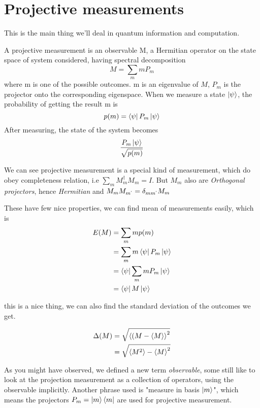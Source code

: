 \section{Projective measurements}
This is the main thing we'll deal in quantum information and computation.

\begin{postulate}
    A projective measurement is an observable M, a Hermitian operator on the state space of system considered, having spectral decomposition
    \begin{equation}
        M = \sum_m mP_m
    \end{equation}
    where m is one of the possible outcomes. m is an eigenvalue of $M$, $P_m$ is the projector onto the corresponding eigenspace. When we measure a state $\ket{\psi}$, the probability of getting the result m is
    \begin{equation}
        p(m) = \bra{\psi}P_m\ket{\psi}
    \end{equation}
    After measuring, the state of the system becomes
    \begin{equation}
        \frac{P_m\ket{\psi}}{\sqrt{p(m)}}
    \end{equation}
\end{postulate}

We can see projective measurement is a special kind of measurement, which do obey completeness relation, i.e $\sum_m M_m^\dag M_m = I$. But $M_m$ also are \textit{Orthogonal projectors}, hence \textit{Hermitian} and $M_mM_{m^`} = \delta_{mm^`}M_m$

These have few nice properties, we can find mean of measurements easily, which is
\begin{align}
    E(M) &= \sum_m m p(m) \\
    &= \sum_m m\bra{\psi} P_m \ket{\psi} \\
    &= \bra{\psi} \sum_m mP_m \ket{\psi} \\
    &= \bra{\psi}M\ket{\psi}
\end{align}

this is a nice thing, we can also find the standard deviation of the outcomes we get.

\begin{align}
    \Delta(M) &= \sqrt{\braket{(M-\braket{M}}^2} \\
    &= \sqrt{\braket{M^2} - \braket{M}^2}
\end{align}

As you might have observed, we defined a new term \textit{observable}, some still like to look at the projection measurement as a collection of operators, using the observable implicitly. Another phrase used is "measure in basis $\ket{m}$", which means the projectors $P_m = \ket{m}\bra{m}$ are used for projective measurement.

